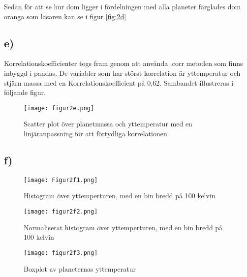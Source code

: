 \documentclass[a4paper]{article}
\begin{document}
Sedan för att se hur dom ligger i fördelningen med alla planeter färglades dom oranga som läsaren kan se i figur \ref{fig:2d}

\subsection{e)}

Korrelationskoefficienter togs fram genom att använda .corr metoden som finns inbyggd i pandas. De variabler som har störst korrelation är yttemperatur och stjärn massa med en Korrelationskoefficient på 0,62. Sambandet illustreras i följande figur.

\begin{figure}[H]
    \begin{small}
        \begin{center}
            \texttt{[image: figur2e.png]}
        \end{center}
        \caption{Scatter plot över planetmassa och yttemperatur med en linjäranpassning för att förtydliga korrelationen}
        \label{fig:2e}
    \end{small}
\end{figure}


\subsection{f)}

\begin{figure}
    \begin{small}
        \begin{center}
            \texttt{[image: Figur2f1.png]}
        \end{center}
        \caption{Histogram över yttemperturen, med en bin bredd på 100 kelvin}
        \label{fig:2f1}
    \end{small}
\end{figure}

\begin{figure}
    \begin{small}
        \begin{center}
            \texttt{[image: figur2f2.png]}
        \end{center}
        \caption{Normaliserat histogram över yttemperturen, med en bin bredd på 100 kelvin}
        \label{fig:2f2}
    \end{small}
\end{figure}

\begin{figure}
    \begin{small}
        \begin{center}
            \texttt{[image: figur2f3.png]}
        \end{center}
        \caption{Boxplot av planeternas yttemperatur}
        \label{fig:2f3}
    \end{small}
\end{figure}
\end{document}
